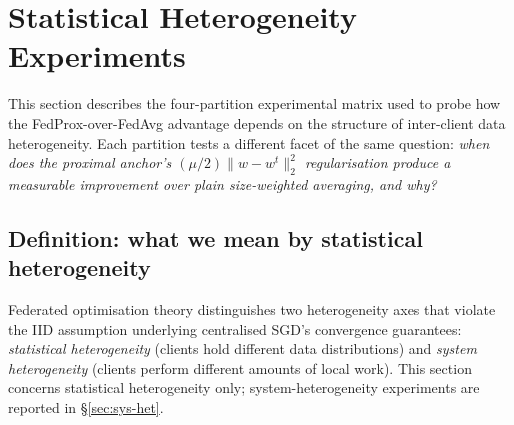 %
%

\section{Statistical Heterogeneity Experiments}\label{sec:stat-het}

This section describes the four-partition experimental matrix used to
probe how the FedProx-over-FedAvg advantage depends on the structure of
inter-client data heterogeneity. Each partition tests a different facet
of the same question: \emph{when does the proximal anchor's
$(\mu/2)\lVert w - w^t\rVert_2^2$ regularisation produce a measurable
improvement over plain size-weighted averaging, and why?}

\subsection{Definition: what we mean by statistical heterogeneity}
\label{sec:stat-het-def}

Federated optimisation theory \citep{li2020fedprox,mcmahan2017fedavg}
distinguishes two heterogeneity axes that violate the IID assumption
underlying centralised SGD's convergence guarantees: \emph{statistical
heterogeneity} (clients hold different data distributions) and
\emph{system heterogeneity} (clients perform different amounts of local
work). This section concerns statistical heterogeneity only;
system-heterogeneity experiments are reported in \S\ref{sec:sys-het}.

